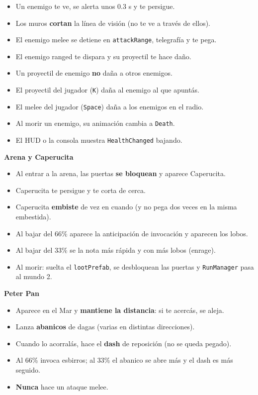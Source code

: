 \documentclass[a4paper,12pt]{article}
\newcommand{\code}[1]{\texttt{#1}}
\begin{document}
\begin{itemize}[label=$\square$]
    \item Un enemigo te ve, se alerta unos 0.3 s y te persigue.
    \item Los muros \textbf{cortan} la línea de visión (no te ve a través de ellos).
    \item El enemigo melee se detiene en \code{attackRange}, telegrafía y te pega.
    \item El enemigo ranged te dispara y su proyectil te hace daño.
    \item Un proyectil de enemigo \textbf{no} daña a otros enemigos.
    \item El proyectil del jugador (\code{K}) daña al enemigo al que apuntás.
    \item El melee del jugador (\code{Space}) daña a los enemigos en el radio.
    \item Al morir un enemigo, su animación cambia a \code{Death}.
    \item El HUD o la consola muestra \code{HealthChanged} bajando.
\end{itemize}

\textbf{Arena y Caperucita}

\begin{itemize}[label=$\square$]
    \item Al entrar a la arena, las puertas \textbf{se bloquean} y aparece Caperucita.
    \item Caperucita te persigue y te corta de cerca.
    \item Caperucita \textbf{embiste} de vez en cuando (y no pega dos veces en la misma embestida).
    \item Al bajar del 66\% aparece la anticipación de invocación y aparecen los lobos.
    \item Al bajar del 33\% se la nota más rápida y con más lobos (enrage).
    \item Al morir: suelta el \code{lootPrefab}, se desbloquean las puertas y \code{RunManager} pasa al mundo 2.
\end{itemize}

\textbf{Peter Pan}

\begin{itemize}[label=$\square$]
    \item Aparece en el Mar y \textbf{mantiene la distancia}: si te acercás, se aleja.
    \item Lanza \textbf{abanicos} de dagas (varias en distintas direcciones).
    \item Cuando lo acorralás, hace el \textbf{dash} de reposición (no se queda pegado).
    \item Al 66\% invoca esbirros; al 33\% el abanico se abre más y el dash es más seguido.
    \item \textbf{Nunca} hace un ataque melee.
\end{itemize}
\end{document}
